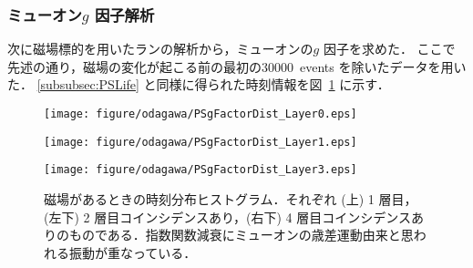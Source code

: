 \subsubsection{ミューオン$g$ 因子解析}
\label{subsubsec:PSgFactor}
次に磁場標的を用いたランの解析から，ミューオンの$g$ 因子を求めた．
ここで先述の通り，磁場の変化が起こる前の最初の30000~events を除いたデータを用いた．
\ref{subsubsec:PSLife} と同様に得られた時刻情報を図~\ref{fig:PSgFactorDist} に示す．
\begin{figure}[h]
	\centering
	\texttt{[image: figure/odagawa/PSgFactorDist\_Layer0.eps]}\\
	\begin{minipage}{0.45\textwidth}
	\centering
	\texttt{[image: figure/odagawa/PSgFactorDist\_Layer1.eps]}
	\end{minipage}
	\begin{minipage}{0.45\textwidth}
	\centering
	\texttt{[image: figure/odagawa/PSgFactorDist\_Layer3.eps]}
	\end{minipage}
	\caption{磁場があるときの時刻分布ヒストグラム．それぞれ (上) 1 層目，(左下) 2 層目コインシデンスあり，(右下) 4 層目コインシデンスありのものである．指数関数減衰にミューオンの歳差運動由来と思われる振動が重なっている．}
	\label{fig:PSgFactorDist}
\end{figure}%

